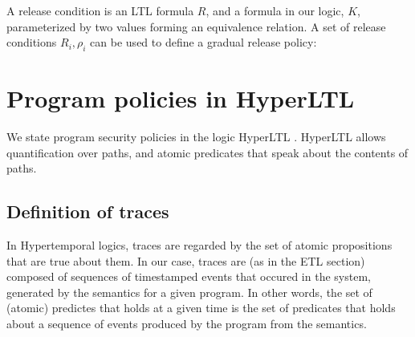 \documentclass[conference]{IEEEtran}
\theoremstyle{definition}
\newcommand{\prin}{\textit{O}}
\newcommand{\hyperltltwo}{HyperLTL\xspace}
\newcommand{\talways}{\mathcal{G}}
\newcommand{\tpossible}[1]{\mathcal{L}_{#1}}
\begin{document}
\begin{Definition}
  A release condition is an LTL formula $R$, and a formula in our
  logic, $K$, parameterized by two values forming an equivalence
  relation.  A set of release conditions $R_i,\rho_i$ can be used to
  define a gradual release policy:
  

\end{Definition}

\section{Program policies in \hyperltltwo} 

We state program security policies in the logic \hyperltltwo
\cite{Clarkson:2014}.  \hyperltltwo allows quantification over paths,
and atomic predicates that speak about the contents of paths.

\subsection{Definition of traces}

In Hypertemporal logics, traces are regarded by the set of atomic
propositions that are true about them.  In our case, traces are (as in
the ETL section) composed of sequences of timestamped events that
occured in the system, generated by the semantics for a given program.
In other words, the set of (atomic) predictes that holds at a given
time is the set of predicates that holds about a sequence of events
produced by the program from the semantics.
\end{document}
